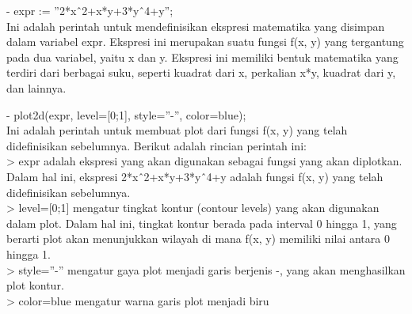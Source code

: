 \documentclass{article}
\begin{document}
\begin{eulernotebook}
\begin{eulercomment}
- expr := ”2*xˆ2+x*y+3*yˆ4+y”;\\
Ini adalah perintah untuk mendefinisikan ekspresi matematika yang
disimpan dalam variabel expr. Ekspresi ini merupakan suatu fungsi f(x,
y) yang tergantung pada dua variabel, yaitu x dan y. Ekspresi ini
memiliki bentuk matematika yang terdiri dari berbagai suku, seperti
kuadrat dari x, perkalian x*y, kuadrat dari y, dan lainnya.

- plot2d(expr, level=[0;1], style=”-”, color=blue);\\
Ini adalah perintah untuk membuat plot dari fungsi f(x, y) yang telah
didefinisikan sebelumnya. Berikut adalah rincian perintah ini:\\
\textgreater{} expr adalah ekspresi yang akan digunakan sebagai fungsi yang akan
diplotkan. Dalam hal ini, ekspresi 2*xˆ2+x*y+3*yˆ4+y adalah fungsi
f(x, y) yang telah didefinisikan sebelumnya.\\
\textgreater{} level=[0;1] mengatur tingkat kontur (contour levels) yang akan
digunakan dalam plot. Dalam hal ini, tingkat kontur berada pada
interval 0 hingga 1, yang berarti plot akan menunjukkan wilayah di
mana f(x, y) memiliki nilai antara 0 hingga 1.\\
\textgreater{} style=”-” mengatur gaya plot menjadi garis berjenis -, yang akan
menghasilkan plot kontur.\\
\textgreater{} color=blue mengatur warna garis plot menjadi biru


\end{eulercomment}
\end{eulernotebook}
\end{document}
